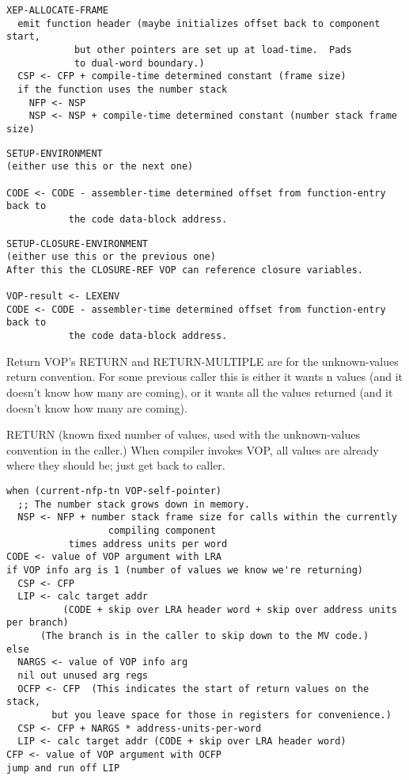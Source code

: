 \begin{verbatim}
XEP-ALLOCATE-FRAME
  emit function header (maybe initializes offset back to component start,
  			but other pointers are set up at load-time.  Pads
			to dual-word boundary.)
  CSP <- CFP + compile-time determined constant (frame size)
  if the function uses the number stack
    NFP <- NSP
    NSP <- NSP + compile-time determined constant (number stack frame size)
\end{verbatim}

\begin{verbatim}
SETUP-ENVIRONMENT
(either use this or the next one)

CODE <- CODE - assembler-time determined offset from function-entry back to
	       the code data-block address.
\end{verbatim}

\begin{verbatim}
SETUP-CLOSURE-ENVIRONMENT
(either use this or the previous one)
After this the CLOSURE-REF VOP can reference closure variables.

VOP-result <- LEXENV
CODE <- CODE - assembler-time determined offset from function-entry back to
	       the code data-block address.
\end{verbatim}

Return VOP's
RETURN and RETURN-MULTIPLE are for the unknown-values return convention.
For some previous caller this is either it wants n values (and it doesn't
know how many are coming), or it wants all the values returned (and it 
doesn't know how many are coming).


RETURN
(known fixed number of values, used with the unknown-values convention
 in the caller.)
When compiler invokes VOP, all values are already where they should be;
just get back to caller.

\begin{verbatim}
when (current-nfp-tn VOP-self-pointer)
  ;; The number stack grows down in memory.
  NSP <- NFP + number stack frame size for calls within the currently
                  compiling component
	       times address units per word
CODE <- value of VOP argument with LRA
if VOP info arg is 1 (number of values we know we're returning)
  CSP <- CFP
  LIP <- calc target addr
          (CODE + skip over LRA header word + skip over address units per branch)
	  (The branch is in the caller to skip down to the MV code.)
else
  NARGS <- value of VOP info arg
  nil out unused arg regs
  OCFP <- CFP  (This indicates the start of return values on the stack,
  		but you leave space for those in registers for convenience.)
  CSP <- CFP + NARGS * address-units-per-word
  LIP <- calc target addr (CODE + skip over LRA header word)
CFP <- value of VOP argument with OCFP
jump and run off LIP
\end{verbatim}

